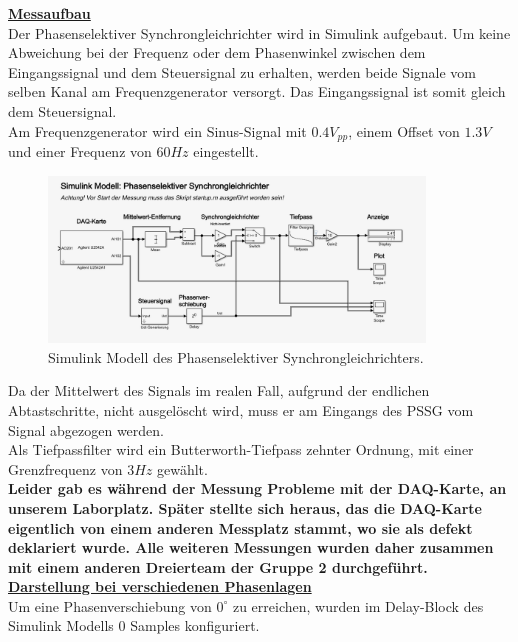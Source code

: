 \documentclass[a4paper,12pt]{article}
\begin{document}
	\noindent
	\underline{\textbf{Messaufbau}} \\ \newline
	\noindent
	Der Phasenselektiver Synchrongleichrichter wird in Simulink aufgebaut.\newline
	Um keine Abweichung bei der Frequenz oder dem Phasenwinkel zwischen dem Eingangssignal und dem Steuersignal zu erhalten, werden beide Signale vom selben Kanal am Frequenzgenerator versorgt. Das Eingangssignal ist somit gleich dem Steuersignal.\\ \newline
	Am Frequenzgenerator wird ein Sinus-Signal mit $0.4V_{pp}$, einem Offset von $1.3V$ und einer Frequenz von $60Hz$ eingestellt.\newline
	\begin{figure}[h]
		\centering
		\includegraphics[width=10cm]{assets/pssg-modell}
		\caption{Simulink Modell des Phasenselektiver Synchrongleichrichters.}
	\end{figure}\newline
	Da der Mittelwert des Signals im realen Fall, aufgrund der endlichen Abtastschritte, nicht ausgelöscht wird, muss er am Eingangs des PSSG vom Signal abgezogen werden.\\ \newline
	Als Tiefpassfilter wird ein Butterworth-Tiefpass zehnter Ordnung, mit einer Grenzfrequenz von $3Hz$ gewählt.\\ \newline
	\textbf{Leider gab es während der Messung Probleme mit der DAQ-Karte, an unserem Laborplatz. Später stellte sich heraus, das die DAQ-Karte eigentlich von einem anderen Messplatz stammt, wo sie als defekt deklariert wurde. Alle weiteren Messungen wurden daher zusammen mit einem anderen Dreierteam der Gruppe 2 durchgeführt.}\\ \newline
	\underline{\textbf{Darstellung bei verschiedenen Phasenlagen}} \\ \newline
	\noindent
	Um eine Phasenverschiebung von $0^{\circ}$ zu erreichen, wurden im Delay-Block des Simulink Modells 0 Samples konfiguriert.\newline
\end{document}

